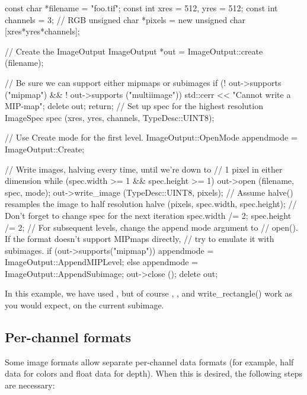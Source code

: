 \begin{code}
        const char *filename = "foo.tif";
        const int xres = 512, yres = 512;
        const int channels = 3;  // RGB
        unsigned char *pixels = new unsigned char [xres*yres*channels];

        // Create the ImageOutput
        ImageOutput *out = ImageOutput::create (filename);

        // Be sure we can support either mipmaps or subimages
        if (! out->supports ("mipmap") && ! out->supports ("multiimage")) {
            std::cerr << "Cannot write a MIP-map\n";
            delete out;
            return;
        }
        // Set up spec for the highest resolution
        ImageSpec spec (xres, yres, channels, TypeDesc::UINT8);

        // Use Create mode for the first level.
        ImageOutput::OpenMode appendmode = ImageOutput::Create;

        // Write images, halving every time, until we're down to
        // 1 pixel in either dimension
        while (spec.width >= 1 && spec.height >= 1) {
            out->open (filename, spec, mode);
            out->write_image (TypeDesc::UINT8, pixels);
            // Assume halve() resamples the image to half resolution
            halve (pixels, spec.width, spec.height);
            // Don't forget to change spec for the next iteration
            spec.width /= 2;
            spec.height /= 2;
            // For subsequent levels, change the append mode argument to
            // open().  If the format doesn't support MIPmaps directly,
            // try to emulate it with subimages.
            if (out->supports("mipmap"))
                appendmode = ImageOutput::AppendMIPLevel;
            else
                appendmode = ImageOutput::AppendSubimage;
        }
        out->close ();
        delete out;
\end{code}

In this example, we have used \writeimage, but of course \writescanline,
\writetile, and {\cf write_rectangle()} work as you would expect, on the
current subimage.


\subsection{Per-channel formats}
\label{sec:imageoutput:channelformats}

Some image formats allow separate per-channel data formats (for example,
{\cf half} data for colors and {\cf float} data for depth).  When this
is desired, the following steps are necessary:

